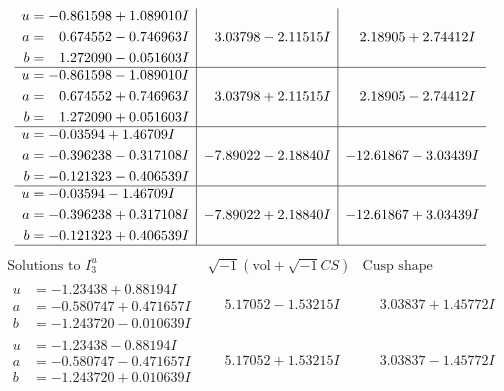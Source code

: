 \documentclass[1p]{elsarticle_modified}
\theoremstyle{definition}
\newcommand{\I}{\sqrt{-1}}
\begin{document}
$$\begin{array}{c|c|c}
\begin{aligned}
u &= -0.861598 + 1.089010 I \\
a &= \phantom{-}0.674552 - 0.746963 I \\
b &= \phantom{-}1.272090 - 0.051603 I\end{aligned}
 & \phantom{-}3.03798 - 2.11515 I & \phantom{-}2.18905 + 2.74412 I \\ \hline\begin{aligned}
u &= -0.861598 - 1.089010 I \\
a &= \phantom{-}0.674552 + 0.746963 I \\
b &= \phantom{-}1.272090 + 0.051603 I\end{aligned}
 & \phantom{-}3.03798 + 2.11515 I & \phantom{-}2.18905 - 2.74412 I \\ \hline\begin{aligned}
u &= -0.03594 + 1.46709 I \\
a &= -0.396238 - 0.317108 I \\
b &= -0.121323 - 0.406539 I\end{aligned}
 & -7.89022 - 2.18840 I & -12.61867 - 3.03439 I \\ \hline\begin{aligned}
u &= -0.03594 - 1.46709 I \\
a &= -0.396238 + 0.317108 I \\
b &= -0.121323 + 0.406539 I\end{aligned}
 & -7.89022 + 2.18840 I & -12.61867 + 3.03439 I\\
 \hline 
 \end{array}$$\newpage$$\begin{array}{c|c|c}  
\text{Solutions to }I^u_{3}& \I (\text{vol} + \sqrt{-1}CS) & \text{Cusp shape}\\
 \hline 
\begin{aligned}
u &= -1.23438 + 0.88194 I \\
a &= -0.580747 + 0.471657 I \\
b &= -1.243720 - 0.010639 I\end{aligned}
 & \phantom{-}5.17052 - 1.53215 I & \phantom{-}3.03837 + 1.45772 I \\ \hline\begin{aligned}
u &= -1.23438 - 0.88194 I \\
a &= -0.580747 - 0.471657 I \\
b &= -1.243720 + 0.010639 I\end{aligned}
 & \phantom{-}5.17052 + 1.53215 I & \phantom{-}3.03837 - 1.45772 I \\ \hline\begin{aligned}

\end{aligned}
\end{array}$$
\end{document}
